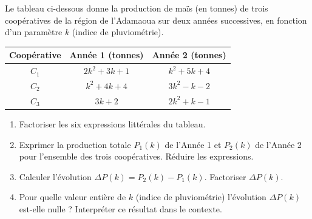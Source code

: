 \documentclass[11pt]{article}
\begin{document}
\begin{exercice}
Le tableau ci-dessous donne la production de maïs (en tonnes) de trois coopératives de la région de l'Adamaoua sur deux années successives, en fonction d'un paramètre $k$ (indice de pluviométrie).

\begin{center}
\begin{tabular}{|c|c|c|}
\hline
\textbf{Coopérative} & \textbf{Année 1 (tonnes)} & \textbf{Année 2 (tonnes)} \\ \hline
$C_1$ & $2k^2 + 3k + 1$ & $k^2 + 5k + 4$ \\ \hline
$C_2$ & $k^2 + 4k + 4$ & $3k^2 - k - 2$ \\ \hline
$C_3$ & $3k + 2$ & $2k^2 + k - 1$ \\ \hline
\end{tabular}
\end{center}

\begin{enumerate}
    \item Factoriser les six expressions littérales du tableau.
    \item Exprimer la production totale $P_1(k)$ de l'Année 1 et $P_2(k)$ de l'Année 2 pour l'ensemble des trois coopératives. Réduire les expressions.
    \item Calculer l'évolution $\Delta P(k) = P_2(k) - P_1(k)$. Factoriser $\Delta P(k)$.
    \item Pour quelle valeur entière de $k$ (indice de pluviométrie) l'évolution $\Delta P(k)$ est-elle nulle ? Interpréter ce résultat dans le contexte.
\end{enumerate}
\end{exercice}
\end{document}
